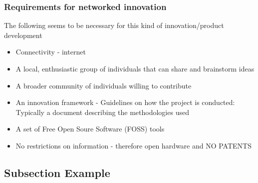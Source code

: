 \documentclass{beamer}
\begin{document}
\begin{frame}
\frametitle{Requirements for networked innovation}

The following seems to be necessary for this kind of innovation/product development

\begin{itemize}
\item Connectivity - internet
\item A local, enthusiastic group of individuals that can share and brainstorm ideas %
\item A broader community of individuals willing to contribute
\item An innovation framework - Guidelines on how the project is conducted:  Typically a document describing the methodologies used
\item A set of Free Open Soure Software (FOSS) tools
\item No restrictions on information - therefore open hardware and NO PATENTS
\end{itemize}
\end{frame}



\subsection{Subsection Example} %



\end{document}
